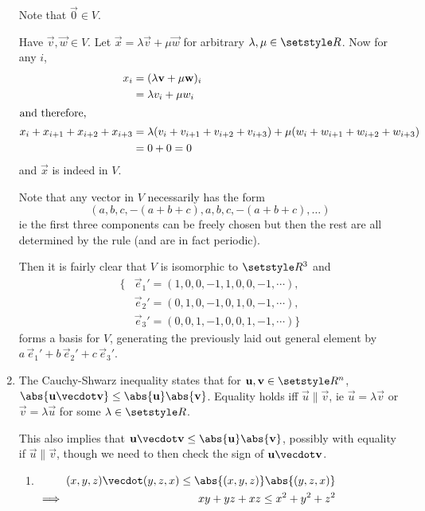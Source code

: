 \documentclass[fleqn,a4paper,11pt]{article}
\begin{document}
\begin{enumerate}[label=\textbf{\arabic*.}]
    Note that \(\vec 0 \in V\).

    Have \(\vec v, \vec w \in V\). Let \(\vec x = \lambda \vec v + \mu \vec w\)
    for arbitrary \(\lambda, \mu \in \Reals\). Now for any \(i\),
    \begin{align*}
     x_i &= (\lambda \vec v + \mu \vec w)_i \\
         &= \lambda v_i + \mu w_i \\
     \intertext{and therefore,}
     x_i + x_{i + 1} + x_{i + 2} + x_{i + 3} &=
      \lambda(v_i + v_{i + 1} + v_{i + 2} + v_{i + 3}) +
      \mu(w_i + w_{i + 1} + w_{i + 2} + w_{i + 3}) \\
      &= 0 + 0 = 0
    \end{align*}
    and \(\vec x\) is indeed in \(V\).

    Note that any vector in \(V\) necessarily has the form
    \begin{equation*}
     (a, b, c, -(a + b + c), a, b, c, -(a + b + c), \dotsc)
    \end{equation*}
    ie the first three components can be freely chosen but then the rest are all
    determined by the rule (and are in fact periodic).

    Then it is fairly clear that \(V\) is isomorphic to \(\Reals^3\) and
    \begin{align*}
     \{&\vec e_1' =
        (1, 0, 0, -1, 1, 0, 0, -1, \cdots), \\
       &\vec e_2' =
        (0, 1, 0, -1, 0, 1, 0, -1, \cdots), \\
       &\vec e_3' =
        (0, 0, 1, -1, 0, 0, 1, -1, \cdots)\}
    \end{align*}
    forms a basis for \(V\), generating the previously laid out general element
    by \(a\,\vec e_1' + b\,\vec e_2' + c\,\vec e_3'\).
   \item
    The Cauchy-Shwarz inequality states that for
    \(\vec u, \vec v \in \Reals^n\),
    \(\abs{\vec u \vecdot \vec v} \le \abs{\vec u} \abs{\vec v}\).
    Equality holds iff \(\vec u \parallel \vec v\), ie
    \(\vec u = \lambda \vec v\) or \(\vec v = \lambda \vec u\) for some
    \(\lambda \in \Reals\).

    This also implies that
    \(\vec u \vecdot \vec v \le \abs{\vec u} \abs{\vec v}\),
    possibly with equality if \(\vec u \parallel \vec v\), though we need to
    then check the sign of \(\vec u \vecdot \vec v\).
    \begin{enumerate}[label=(\alph*)]
     \item \(
      \begin{alignedat}[t]2
       && (x, y, z) \vecdot (y, z, x) \le \abs{(x, y, z)} \abs{(y, z, x)} \\
       \implies{}&& xy + yz + xz \le x^2 + y^2 + z^2
      \end{alignedat} \)


\end{enumerate}
\end{enumerate}
\end{document}

